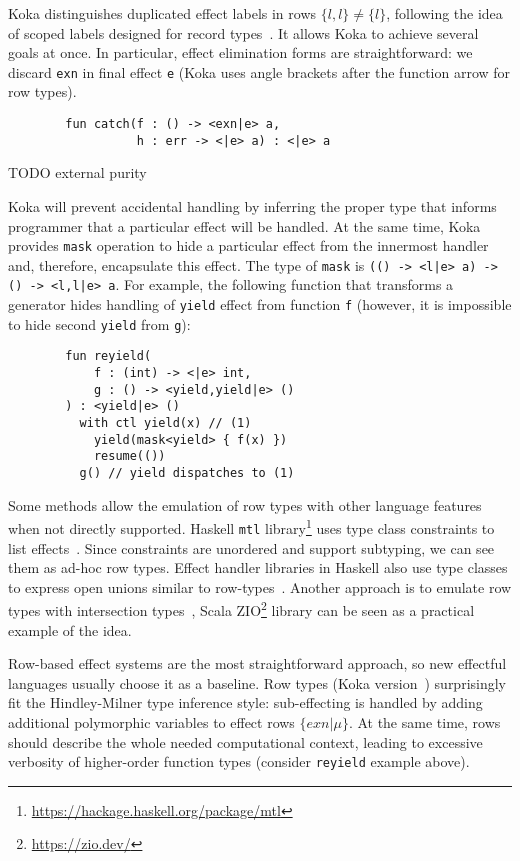 \documentclass[conference]{IEEEtran}
\begin{document}
    Koka distinguishes duplicated effect labels in rows $\{l,l\}\neq \{l\}$, following the idea of scoped labels designed for record types~\cite{leijen2005extensible}.
    It allows Koka to achieve several goals at once.
    In particular, effect elimination forms are straightforward: we discard \texttt{exn} in final effect \texttt{e} (Koka uses angle brackets after the function arrow for row types).
    \begin{verbatim}
        fun catch(f : () -> <exn|e> a,
                  h : err -> <|e> a) : <|e> a
    \end{verbatim}

    TODO external purity %

    Koka will prevent accidental handling by inferring the proper type that informs programmer that a particular effect will be handled.
    At the same time, Koka provides \texttt{mask} operation to hide a particular effect from the innermost handler and, therefore, encapsulate this effect.
    The type of \texttt{mask} is \texttt{(() -> <l|e> a) -> () -> <l,l|e> a}.
    For example, the following function that transforms a generator hides handling of \texttt{yield} effect from function \texttt{f} (however, it is impossible to hide second \texttt{yield} from \texttt{g}):
    \begin{verbatim}
        fun reyield(
            f : (int) -> <|e> int,
            g : () -> <yield,yield|e> ()
        ) : <yield|e> ()
          with ctl yield(x) // (1)
            yield(mask<yield> { f(x) })
            resume(())
          g() // yield dispatches to (1)
    \end{verbatim}


    Some methods allow the emulation of row types with other language features when not directly supported.
    Haskell \texttt{mtl} library\footnote{\url{https://hackage.haskell.org/package/mtl}} uses type class constraints to list effects~\cite{jones1995functional}.
    Since constraints are unordered and support subtyping, we can see them as ad-hoc row types.
    Effect handler libraries in Haskell also use type classes to express open unions similar to row-types~\cite{swierstra2008data}.
    Another approach is to emulate row types with intersection types~\cite{xie2020row}, Scala ZIO\footnote{\url{https://zio.dev/}} library can be seen as a practical example of the idea.

    Row-based effect systems are the most straightforward approach, so new effectful languages usually choose it as a baseline.
    Row types (Koka version~\cite{leijen2014koka, leijen2017type}) surprisingly fit the Hindley-Milner type inference style: sub-effecting is handled by adding additional polymorphic variables to effect rows $\{exn|\mu\}$.
    At the same time, rows should describe the whole needed computational context, leading to excessive verbosity of higher-order function types (consider \texttt{reyield} example above).
\end{document}
